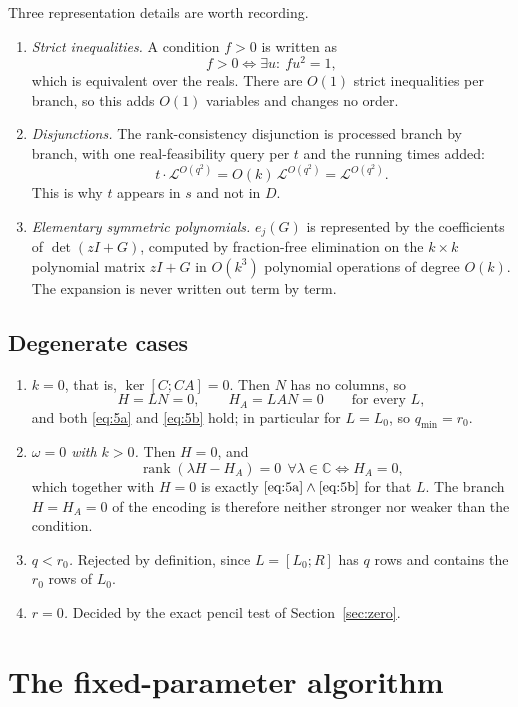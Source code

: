 \documentclass[journal]{IEEEtran}
\theoremstyle{plainn}
\theoremstyle{remark}
\begin{document}
Three representation details are worth recording.

\begin{enumerate}
\item \emph{Strict inequalities.} A condition $f>0$ is written as
\[
f>0\iff\exists u:\ fu^2=1,
\]
which is equivalent over the reals. There are $O(1)$ strict inequalities per
branch, so this adds $O(1)$ variables and changes no order.
\item \emph{Disjunctions.} The rank-consistency disjunction is processed branch
by branch, with one real-feasibility query per $t$ and the running times
added:
\[
t\cdot\mathcal L^{O(q^2)}=O(k)\,\mathcal L^{O(q^2)}=\mathcal L^{O(q^2)} .
\]
This is why $t$ appears in $s$ and not in $D$.
\item \emph{Elementary symmetric polynomials.} $e_j(G)$ is represented by the
coefficients of $\det(zI+G)$, computed by fraction-free elimination on the
$k\times k$ polynomial matrix $zI+G$ in $O(k^3)$ polynomial operations of
degree $O(k)$. The expansion is never written out term by term.
\end{enumerate}

\subsection{Degenerate cases}\label{sec:deg}

\begin{enumerate}
\item \emph{$k=0$}, that is, $\ker[C;CA]=0$. Then $N$ has no columns, so
\[
H=LN=0,\qquad H_A=LAN=0\qquad\text{for every }L,
\]
and both \eqref{eq:5a} and \eqref{eq:5b} hold; in particular for $L=L_0$, so
$q_{\min}=r_0$.
\item \emph{$\omega=0$ with $k>0$.} Then $H=0$, and
\[
\operatorname{rank}(\lambda H-H_A)=0\ \ \forall\lambda\in\mathbb C
\iff H_A=0,
\]
which together with $H=0$ is exactly $\eqref{eq:5a}\wedge\eqref{eq:5b}$ for
that $L$. The branch $H=H_A=0$ of the encoding is therefore neither stronger
nor weaker than the condition.
\item \emph{$q<r_0$.} Rejected by definition, since $L=[L_0;R]$ has $q$ rows
and contains the $r_0$ rows of $L_0$.
\item \emph{$r=0$.} Decided by the exact pencil test of Section~\ref{sec:zero}.
\end{enumerate}

\section{The fixed-parameter algorithm}\label{sec:fpt}
\end{document}
